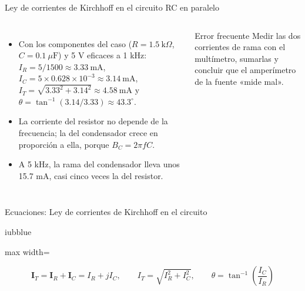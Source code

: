 \documentclass[aspectratio=169,11pt,xcolor={table}]{beamer}
\begin{document}
\begin{frame}{{\normalsize Ley de corrientes de Kirchhoff en el circuito RC en paralelo}}
\begin{columns}[c,onlytextwidth]
\small
\begin{itemize}\setlength{\itemsep}{4pt}
  \item Con los componentes del caso ($R = 1.5\ \text{k}\Omega$, $C = 0.1\ \mu\text{F}$) y 5 V eficaces a 1 kHz: $I_R = 5/1500 \approx 3.33\ \text{mA}$, $I_C = 5 \times 0.628 \times 10^{-3} \approx 3.14\ \text{mA}$, $I_T = \sqrt{3.33^2 + 3.14^2} \approx 4.58\ \text{mA}$ y $\theta = \tan^{-1}(3.14/3.33) \approx 43.3^\circ$.
  \item La corriente del resistor no depende de la frecuencia; la del condensador crece en proporción a ella, porque $B_C = 2\pi f C$.
  \item A 5 kHz, la rama del condensador lleva unos 15.7 mA, casi cinco veces la del resistor.
\end{itemize}
\begin{cardO}{Error frecuente}
\footnotesize Medir las dos corrientes de rama con el multímetro, sumarlas y concluir que el amperímetro de la fuente «mide mal».
\end{cardO}
\end{columns}
\end{frame}

\begin{frame}{{\normalsize Ecuaciones: Ley de corrientes de Kirchhoff en el circuito}}
\begin{cajaplana}{iubblue}
\centering
\begin{adjustbox}{max width=\linewidth}
\begin{minipage}{1.27\linewidth}
{\large
\begin{equation*}
  \mathbf{I}_T = \mathbf{I}_R + \mathbf{I}_C = I_R + jI_C, \qquad I_T = \sqrt{I_R^{2} + I_C^{2}}, \qquad \theta = \tan^{-1}\!\left(\frac{I_C}{I_R}\right)
\end{equation*}
}
\end{minipage}
\end{adjustbox}
\end{cajaplana}
\end{frame}
\end{document}
